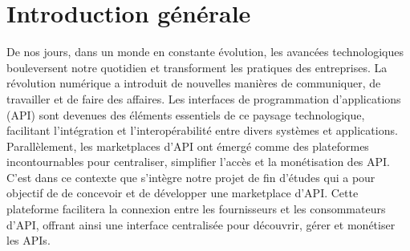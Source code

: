\chapter*{Introduction générale}


De nos jours, dans un monde en constante évolution, les avancées technologiques bouleversent notre quotidien et transforment les pratiques des entreprises. La révolution numérique a introduit de nouvelles manières de communiquer, de travailler et de faire des affaires. Les interfaces de programmation d’applications (API) sont devenues des éléments essentiels de ce paysage technologique, facilitant l’intégration et l’interopérabilité entre divers systèmes et applications. \\
Parallèlement, les marketplaces d'API ont émergé comme des plateformes incontournables pour centraliser, simplifier l'accès et la monétisation des API.\\
C’est dans ce contexte que s’intègre notre projet de fin d’études qui a pour objectif de de concevoir et de développer une marketplace d’API. Cette plateforme facilitera la connexion entre les fournisseurs et les consommateurs d'API, offrant ainsi une interface centralisée pour découvrir, gérer et monétiser les APIs.  \\
